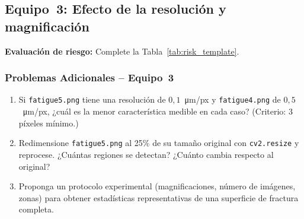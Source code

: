 \documentclass[12pt,a4paper]{article}
\begin{document}
\subsection{Equipo~3: Efecto de la resolución y magnificación}
\label{sec:eq3}

\noindent{}

\textbf{Evaluación de riesgo:} Complete la Tabla~\ref{tab:risk_template}.

\subsubsection*{Problemas Adicionales -- Equipo~3}

\begin{enumerate}
	\item[\textbf{P3.1}] Si \texttt{fatigue5.png} tiene una resolución de
	      $0{,}1$~\si{\micro\m}/px y \texttt{fatigue4.png} de
	      $0{,}5$~\si{\micro\m}/px, ¿cuál es la menor característica medible
	      en cada caso?  (Criterio: 3 píxeles mínimo.)

	\item[\textbf{P3.2}] Redimensione \texttt{fatigue5.png} al 25\% de su
	      tamaño original con \texttt{cv2.resize} y reprocese.  ¿Cuántas
	      regiones se detectan?  ¿Cuánto cambia respecto al original?

	\item[\textbf{P3.3}] Proponga un protocolo experimental (magnificaciones,
	      número de imágenes, zonas) para obtener estadísticas representativas
	      de una superficie de fractura completa.
\end{enumerate}
\end{document}
